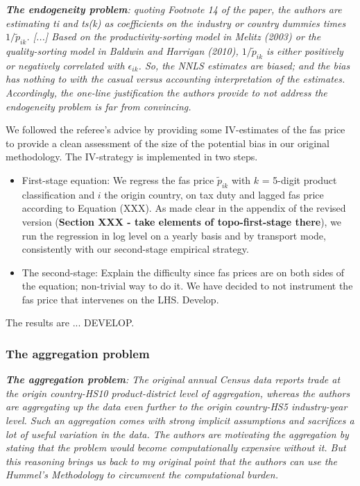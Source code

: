 \documentclass[a4paper,12pt]{article}
\begin{document}
\textit{\textbf{The endogeneity problem}: quoting Footnote 14 of the paper, the authors
are estimating ti and ts(k) as coefficients on the industry or country
dummies times $1/\widetilde{p}_{ik}$. [...] Based on the productivity-sorting model in Melitz (2003) or the quality-sorting
model in Baldwin and Harrigan (2010),  $1/\widetilde{p}_{ik}$ is either positively
or negatively correlated with $\epsilon_{ik}$. So, the NNLS estimates are biased; and
the bias has nothing to with the casual versus accounting interpretation of
the estimates. Accordingly, the one-line justification the authors provide
to not address the endogeneity problem is far from convincing.}


We followed the referee's advice by providing some IV-estimates of the fas price to provide a clean assessment of the size of the potential bias in our original methodology. The IV-strategy is implemented in two steps.

\begin{itemize}
\item First-stage equation: We regress the fas price $\widetilde{p}_{ik}$ with $k$ = 5-digit product classification and $i$ the origin country, on tax duty and lagged fas price according to Equation (XXX). As made clear in the appendix of the revised version (\textbf{Section XXX - take elements of topo-first-stage there}), we run the regression in log level on a yearly basis and by transport mode, consistently with our second-stage empirical strategy.

\item The second-stage: Explain the difficulty since fas prices are on both sides of the equation; non-trivial way to do it. We have decided to not instrument the fas price that intervenes on the LHS. Develop.




\end{itemize}

The results are ... DEVELOP.

\subsubsection{The aggregation problem}

\textit{\textbf{The aggregation problem}: The original annual Census data reports
trade at the origin country-HS10 product-district level of aggregation,
whereas the authors are aggregating up the data even further to the origin
country-HS5 industry-year level. Such an aggregation comes with strong implicit assumptions and sacrifices a lot of useful variation in the data.
The authors are motivating the aggregation by stating that the problem
would become computationally expensive without it. But this reasoning
brings us back to my original point that the authors can use the Hummel's
Methodology to circumvent the computational burden.}
\end{document}
